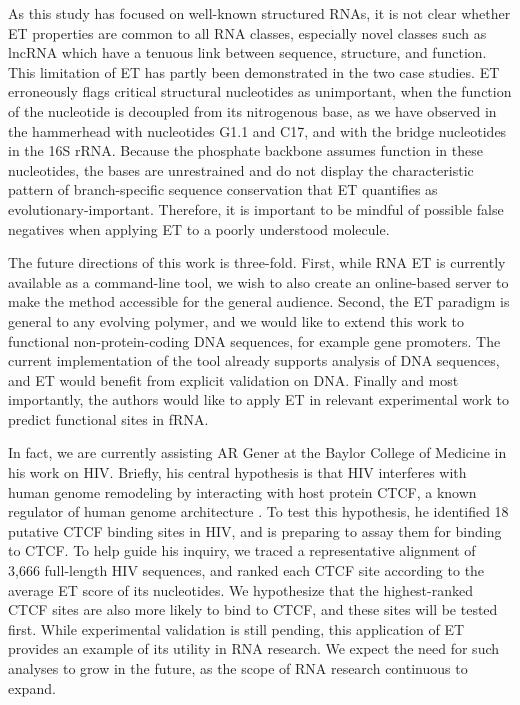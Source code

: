 \documentclass[12pt,a4paper]{report}
\begin{document}
As this study has focused on well-known structured RNAs, it is not clear whether ET properties are common to all RNA classes, especially novel classes such as lncRNA which have a tenuous link between sequence, structure, and function. This limitation of ET has partly been demonstrated in the two case studies. ET erroneously flags critical structural nucleotides as unimportant, when the function of the nucleotide is decoupled from its nitrogenous base, as we have observed in the hammerhead with nucleotides G1.1 and C17, and with the bridge nucleotides in the 16S rRNA. Because the phosphate backbone assumes function in these nucleotides, the bases are unrestrained and do not display the characteristic pattern of branch-specific sequence conservation that ET quantifies as evolutionary-important. Therefore, it is important to be mindful of possible false negatives when applying ET to a poorly understood molecule.


The future directions of this work is three-fold. First, while RNA ET is currently available as a command-line tool, we wish to also create an online-based server to make the method accessible for the general audience. Second, the ET paradigm is general to any evolving polymer, and we would like to extend this work to functional non-protein-coding DNA sequences, for example gene promoters. The current implementation of the tool already supports analysis of DNA sequences, and ET would benefit from explicit validation on DNA. Finally and most importantly, the authors would like to apply ET in relevant experimental work to predict functional sites in fRNA. 

In fact, we are currently assisting AR Gener at the Baylor College of Medicine in his work on HIV. Briefly, his central hypothesis is that HIV interferes with human genome remodeling by interacting with host protein CTCF, a known regulator of human genome architecture \cite{pmid26045254_ctcf}. To test this hypothesis, he identified 18 putative CTCF binding sites in HIV, and is preparing to assay them for binding to CTCF. To help guide his inquiry, we traced a representative alignment of 3,666 full-length HIV sequences, and ranked each CTCF site according to the average ET score of its nucleotides. We hypothesize that the highest-ranked CTCF sites are also more likely to bind to CTCF, and these sites will be tested first. While experimental validation is still pending, this application of ET provides an example of its utility in RNA research. We expect the need for such analyses to grow in the future, as the scope of RNA research continuous to expand.
\end{document}

